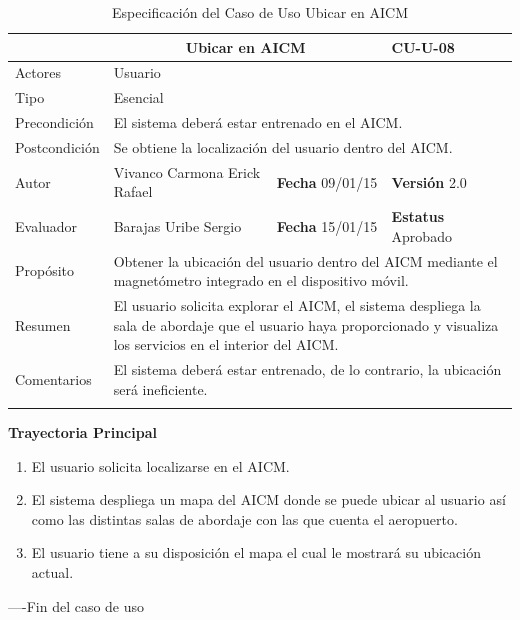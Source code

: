 \begin{longtable}{|p{2.5cm}|p{6.4cm}|p{2cm}|p{2cm}|}
	\hline
		\rowcolor[RGB]{51,153,255}{Caso de Uso}&\multicolumn{2}{c}{Ubicar en AICM}&{\textbf{CU-U-08}}\\
	\hline
		{Actores}&\multicolumn{3}{p{11.2cm}|}{Usuario}\\
	\hline
		{Tipo}&\multicolumn{3}{p{11.2cm}|}{Esencial}\\
	\hline
		{Precondición}&\multicolumn{3}{p{11.2cm}|}{El sistema deberá estar entrenado en el AICM.}\\
	\hline
		{Postcondición}&\multicolumn{3}{p{11.2cm}|}{Se obtiene la localización del usuario dentro del AICM.}\\
	\hline
		{Autor}&{Vivanco Carmona Erick Rafael}&{\textbf{Fecha} 09/01/15}&{\textbf{Versión} 2.0}\\
			\hline
		{Evaluador}&{Barajas Uribe Sergio}&{\textbf{Fecha} 15/01/15}&{\textbf{Estatus} Aprobado}\\
	\hline
		{Propósito}&\multicolumn{3}{p{11.2cm}|}{Obtener la ubicación del usuario dentro del AICM mediante el magnetómetro integrado en el dispositivo móvil. }\\
	\hline
		{Resumen}&\multicolumn{3}{p{11.2cm}|}{El usuario solicita explorar el AICM, el sistema despliega la sala de abordaje que el usuario haya proporcionado y visualiza los servicios en el interior del AICM.}\\	
	\hline
		{Comentarios}&\multicolumn{3}{p{11.2cm}|}{El sistema deberá estar entrenado, de lo contrario, la ubicación será ineficiente.}\\
	\hline
	\caption[Especificación del Caso de Uso Ubicar en AICM]{Especificación del Caso de Uso Ubicar en AICM}
    	\label{tab:cuUbicarAICM}
\end{longtable}
\clearpage

\begin{flushleft}
	\textbf{Trayectoria Principal}\\
	\begin{enumerate}
		\item El usuario solicita localizarse en el AICM.
		\item El sistema despliega un mapa del AICM donde se puede ubicar al usuario así como las distintas salas de abordaje con las que cuenta el 
		aeropuerto.
		\item El usuario tiene a su disposición el mapa el cual le mostrará su ubicación actual.
	\end{enumerate}
\end{flushleft}
----Fin del caso de uso
\clearpage


